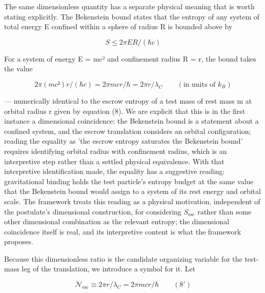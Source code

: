 \documentclass[11pt]{article}
\begin{document}
The same dimensionless quantity has a separate physical meaning that is
worth stating explicitly. The Bekenstein bound states that the entropy
of any system of total energy E confined within a sphere of radius R is
bounded above by

\[ S \le  2πER/(ℏc) \]

For a system of energy E = mc² and confinement radius R = r, the bound
takes the value

\[ 2π(mc²)r/(ℏc) = 2πmcr/ℏ = 2πr/λ_C\qquad(\text{in units of }k_{B}) \]

--- numerically identical to the escrow entropy of a test mass of rest
mass m at orbital radius r given by equation (8). We are explicit that
this is in the first instance a dimensional coincidence: the Bekenstein
bound is a statement about a confined system, and the escrow translation
considers an orbital configuration; reading the equality as 'the escrow
entropy saturates the Bekenstein bound' requires identifying orbital
radius with confinement radius, which is an interpretive step rather
than a settled physical equivalence. With that interpretive
identification made, the equality has a suggestive reading:
gravitational binding holds the test particle's entropy budget at the
same value that the Bekenstein bound would assign to a system of its
rest energy and orbital scale. The framework treats this reading as a
physical motivation, independent of the postulate's dimensional
construction, for considering $S_{\mathrm{esc}}$ rather than some other dimensional
combination as the relevant entropy; the dimensional coincidence itself
is real, and its interpretive content is what the framework proposes.

Because this dimensionless ratio is the candidate organizing variable
for the test-mass leg of the translation, we introduce a symbol for it.
Let

\[ 𝒩_{\mathrm{esc}} \equiv  2πr/λ_C = 2πmcr/ℏ \qquad(8') \]
\end{document}

